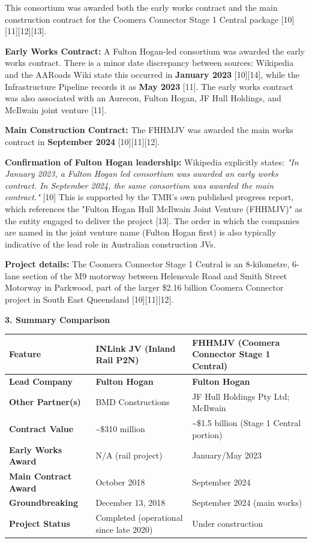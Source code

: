 \documentclass[table]{gtech}
\begin{document}
\begin{tcolorbox}
This consortium was awarded both the early works contract and the main construction contract for the Coomera Connector Stage 1 Central package [10][11][12][13].

\textbf{Early Works Contract:} A Fulton Hogan-led consortium was awarded the early works contract. There is a minor date discrepancy between sources: Wikipedia and the AARoads Wiki state this occurred in \textbf{January 2023} [10][14], while the Infrastructure Pipeline records it as \textbf{May 2023} [11]. The early works contract was also associated with an Aurecon, Fulton Hogan, JF Hull Holdings, and McIlwain joint venture [11].

\textbf{Main Construction Contract:} The FHHMJV was awarded the main works contract in \textbf{September 2024} [10][11][12].

\textbf{Confirmation of Fulton Hogan leadership:} Wikipedia explicitly states: \emph{"In January 2023, a Fulton Hogan led consortium was awarded an early works contract. In September 2024, the same consortium was awarded the main contract."} [10] This is supported by the TMR's own published progress report, which references the "Fulton Hogan Hull McIlwain Joint Venture (FHHMJV)" as the entity engaged to deliver the project [13]. The order in which the companies are named in the joint venture name (Fulton Hogan first) is also typically indicative of the lead role in Australian construction JVs.

\textbf{Project details:} The Coomera Connector Stage 1 Central is an 8-kilometre, 6-lane section of the M9 motorway between Helensvale Road and Smith Street Motorway in Parkwood, part of the larger \$2.16 billion Coomera Connector project in South East Queensland [10][11][12].

\smallskip\noindent\textbf{3. Summary Comparison}\par\smallskip

\begin{center}\footnotesize\begin{tabular}{@{}p{2.4cm}p{4.2cm}p{4.2cm}@{}}
\toprule
\textbf{Feature} & \textbf{INLink JV (Inland Rail P2N)} & \textbf{FHHMJV (Coomera Connector Stage 1 Central)} \\
\midrule
\textbf{Lead Company} & \textbf{Fulton Hogan} & \textbf{Fulton Hogan} \\
\textbf{Other Partner(s)} & BMD Constructions & JF Hull Holdings Pty Ltd; McIlwain \\
\textbf{Contract Value} & \textasciitilde{}\$310 million & \textasciitilde{}\$1.5 billion (Stage 1 Central portion) \\
\textbf{Early Works Award} & N/A (rail project) & January/May 2023 \\
\textbf{Main Contract Award} & October 2018 & September 2024 \\
\textbf{Groundbreaking} & December 13, 2018 & September 2024 (main works) \\
\textbf{Project Status} & Completed (operational since late 2020) & Under construction \\
\bottomrule
\end{tabular}\end{center}


\end{tcolorbox}
\end{document}
